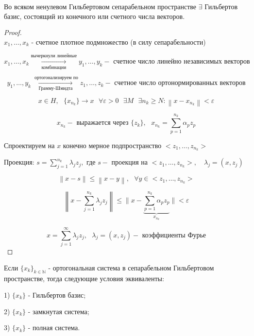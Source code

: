 \documentclass[12pt, a4paper]{report}
\begin{document}
\begin{theorem}
    Во всяком ненулевом Гильбертовом сепарабельном пространстве \( \exists  \)  Гильбертов базис, состоящий из конечного или счетного числа векторов.
\end{theorem}


\begin{proof}
    \[  \] 
    \( x_1, \ldots, x_k \)  - счетное плотное подмножество (в силу сепарабельности)

    \[ x_1, \ldots, x_k  \underset{\text{комбинации} }{\xrightarrow{\text{вычеркнули линейные} }} y_1, \ldots, y_k  - \text{ счетное число линейно независимых  векторов }  \] 

    \[ y_1, \ldots, y_k \underset{\text{Грамму-Шмидта} }{\xrightarrow{\text{ ортогонализируем по} }} z_1, \ldots, z_k - \text{ счетное число ортонормированных  векторов}  \] 

    \[ x \in  H , \text{ } \{x_{n_k} \} \to  x \text{ } \forall  \varepsilon > 0 \text{ } \exists  M \text{ } \exists  n_k \geq  N : \left\lVert x - x_{n_k}  \right\rVert < \varepsilon \] 

    \[ x_{n_k}  - \text{ выражается через } \{z_k\} , \text{ }  x_{n_k} = \sum_{p=1} ^{n_k } \alpha_p z_p \] 

    Спроектируем на \( x \)  конечно мерное подпространство \( <z_1, \ldots, z_{n_k} > \) 

    Проекция: \( \displaystyle  s = \sum_{j =1} ^{n_k }\lambda_j z_j , \text{ где } s - \text{ проекция на } <z_1, \ldots, z_{n_k}>   , \quad  \lambda_j = (x , z_j) \) 

    \[ \left\lVert  x - s  \right\rVert  \le  \left\lVert x -y  \right\rVert , \text{ } \forall  y \in  <z_1, \ldots, z_{n_k} > \] 


    \[ \left\lVert x - \sum _{j=1} ^{n_k } \lambda_j z_j \right\rVert \le  \bigg\lVert  x- \underbrace{\sum_{p=1}^{n_k} \alpha_p z_p}_{x_{n_k} }  \bigg\rVert < \varepsilon\] 

    \[ x = \sum_{j =1} ^{ \infty } \lambda_j z_j ,\text{ }   \lambda_j = (x , z_j) - \text{ коэффициенты Фурье}   \] 
    
\end{proof}

\begin{theorem}
    Если \( \{x_k\}_{k \in  \mathbb{N}}  \)  - ортогональная система в сепарабельном Гильбертовом пространстве, тогда следующие условия эквиваленты: 

    1) \( \{x_k\} \)  - Гильбертов базис; 

    2) \( \{x_k\} \) - замкнутая система; 

    3) \( \{x_k\} \) - полная система.
\end{theorem}
\end{document}
